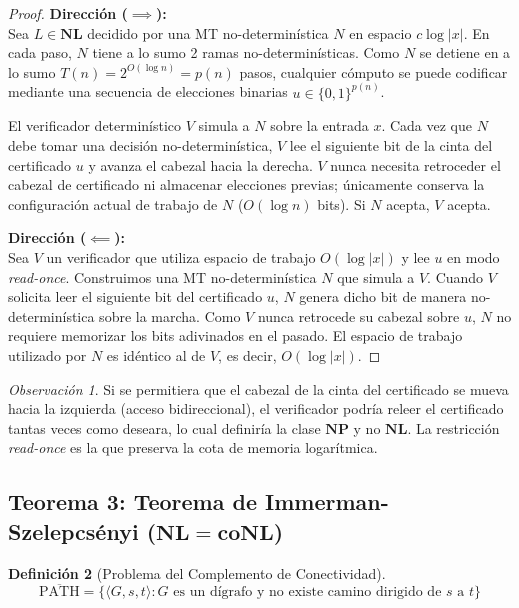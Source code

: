 \documentclass[11pt, a4paper]{article}
\theoremstyle{definition}
\newtheorem{definicion}{Definición}[section]
\theoremstyle{plain}
\theoremstyle{remark}
\newtheorem{observacion}[definicion]{Observación}
\newcommand{\classNL}{\mathbf{NL}}
\newcommand{\classcoNL}{\mathbf{coNL}}
\newcommand{\classNP}{\mathbf{NP}}
\newcommand{\coPATH}{\overline{\text{PATH}}}
\begin{document}
\begin{proof}
\textbf{Dirección ($\implies$):}\\
Sea $L \in \classNL$ decidido por una MT no-determinística $N$ en espacio $c \log |x|$. En cada paso, $N$ tiene a lo sumo 2 ramas no-determinísticas. Como $N$ se detiene en a lo sumo $T(n) = 2^{O(\log n)} = p(n)$ pasos, cualquier cómputo se puede codificar mediante una secuencia de elecciones binarias $u \in {\{0,1\}}^{p(n)}$.

El verificador determinístico $V$ simula a $N$ sobre la entrada $x$. Cada vez que $N$ debe tomar una decisión no-determinística, $V$ lee el siguiente bit de la cinta del certificado $u$ y avanza el cabezal hacia la derecha. $V$ nunca necesita retroceder el cabezal de certificado ni almacenar elecciones previas; únicamente conserva la configuración actual de trabajo de $N$ ($O(\log n)$ bits). Si $N$ acepta, $V$ acepta.

\vspace{0.8em}
\noindent\textbf{Dirección ($\impliedby$):}\\
Sea $V$ un verificador que utiliza espacio de trabajo $O(\log |x|)$ y lee $u$ en modo \textit{read-once}. Construimos una MT no-determinística $N$ que simula a $V$. Cuando $V$ solicita leer el siguiente bit del certificado $u$, $N$ genera dicho bit de manera no-determinística sobre la marcha. Como $V$ nunca retrocede su cabezal sobre $u$, $N$ no requiere memorizar los bits adivinados en el pasado. El espacio de trabajo utilizado por $N$ es idéntico al de $V$, es decir, $O(\log |x|)$.
\end{proof}

\begin{observacion}
Si se permitiera que el cabezal de la cinta del certificado se mueva hacia la izquierda (acceso bidireccional), el verificador podría releer el certificado tantas veces como deseara, lo cual definiría la clase $\classNP$ y no $\classNL$. La restricción \textit{read-once} es la que preserva la cota de memoria logarítmica.
\end{observacion}

\subsection{Teorema 3: Teorema de Immerman-Szelepcsényi (\texorpdfstring{$\classNL = \classcoNL$}{NL = coNL})}

\begin{definicion}[Problema del Complemento de Conectividad]
\[
\coPATH = \{\langle G, s, t \rangle : G \text{ es un dígrafo y no existe camino dirigido de } s \text{ a } t\}
\]
\end{definicion}
\end{document}
